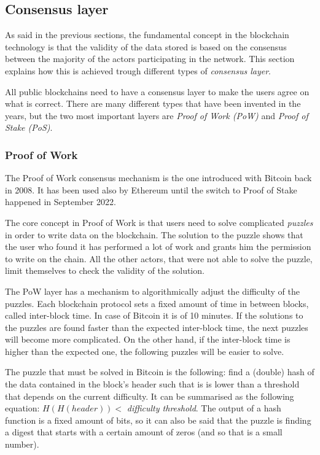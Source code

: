 \subsection{Consensus layer}

As said in the previous sections, the fundamental concept in the blockchain technology is that the validity of the data stored is based on the consensus between the majority of the actors participating in the network. This section explains how this is achieved trough different types of \textit{consensus layer}.

All public blockchains need to have a consensus layer to make the users agree on what is correct. There are many different types that have been invented in the years, but the two most important layers are \textit{Proof of Work (PoW)} and \textit{Proof of Stake (PoS)}.

\subsubsection{Proof of Work}

The Proof of Work consensus mechanism is the one introduced with Bitcoin back in 2008. It has been used also by Ethereum until the switch to Proof of Stake happened in September 2022. 

The core concept in Proof of Work is that users need to solve complicated \textit{puzzles} in order to write data on the blockchain. The solution to the puzzle shows that the user who found it has performed a lot of work and grants him the permission to write on the chain. All the other actors, that were not able to solve the puzzle, limit themselves to check the validity of the solution.

The PoW layer has a mechanism to algorithmically adjust the difficulty of the puzzles. Each blockchain protocol sets a fixed amount of time in between blocks, called inter-block time. In case of Bitcoin it is of 10 minutes. If the solutions to the puzzles are found faster than the expected inter-block time, the next puzzles will become more complicated. On the other hand, if the inter-block time is higher than the expected one, the following puzzles will be easier to solve.

The puzzle that must be solved in Bitcoin is the following: find a (double) hash of the data contained in the block's header such that is is lower than a threshold that depends on the current difficulty. It can be summarised as the following equation: $H(H(header)) < $ \textit{difficulty threshold}. The output of a hash function is a fixed amount of bits, so it can also be said that the puzzle is finding a digest that starts with a certain amount of zeros (and so that is a small number).

